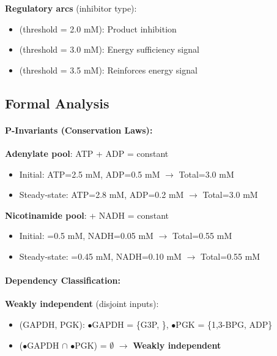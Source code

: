 \textbf{Regulatory arcs} (inhibitor type):

\begin{itemize}
    \item {} (threshold = 2.0 mM): Product inhibition
    \item {} (threshold = 3.0 mM): Energy sufficiency signal
    \item {} (threshold = 3.5 mM): Reinforces energy signal
\end{itemize}

\subsection{Formal Analysis}
\label{subsec:glycolysis-analysis}

\paragraph{P-Invariants (Conservation Laws):}

\textbf{Adenylate pool}: ATP + ADP = constant

\begin{itemize}
    \item Initial: ATP=2.5 mM, ADP=0.5 mM $\to$ Total=3.0 mM
    \item Steady-state: ATP=2.8 mM, ADP=0.2 mM $\to$ Total=3.0 mM \checkmark
\end{itemize}

\textbf{Nicotinamide pool}:  + NADH = constant

\begin{itemize}
    \item Initial: =0.5 mM, NADH=0.05 mM $\to$ Total=0.55 mM
    \item Steady-state: =0.45 mM, NADH=0.10 mM $\to$ Total=0.55 mM \checkmark
\end{itemize}

\paragraph{Dependency Classification:}

\textbf{Weakly independent} (disjoint inputs):

\begin{itemize}
    \item (GAPDH, PGK): $\bullet$GAPDH = \{G3P, \}, $\bullet$PGK = \{1,3-BPG, ADP\}
    \item ($\bullet$GAPDH $\cap$ $\bullet$PGK) = $\emptyset$ $\to$ \textbf{Weakly independent}
\end{itemize}

